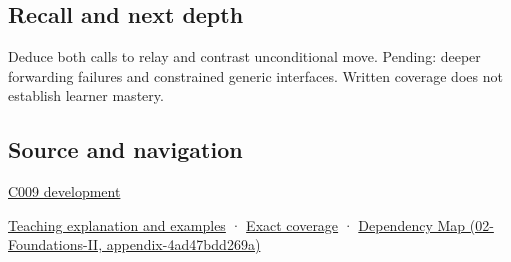 \subsection{Recall and next depth}\label{appendix-0104b704fb11-recall-and-next-depth}

Deduce both calls to relay and contrast unconditional move. Pending: deeper forwarding failures and constrained generic interfaces. Written coverage does not establish learner mastery.

\subsection{Source and navigation}\label{appendix-0104b704fb11-source-and-navigation}

\hyperref[appendix-fd090d982a15-m009---parts-127-147]{C009 development}

\hyperref[01-foundations-i-ch003-move-permission-is-not-resource-transfer]{Teaching explanation and examples} · \hyperref[appendix-fd090d982a15-m008---parts-113-126]{Exact coverage} · \href{../02-Foundations-II/main.pdf\#nameddest=appendix-4ad47bdd269a}{Dependency Map (02-Foundations-II, appendix-4ad47bdd269a)}
